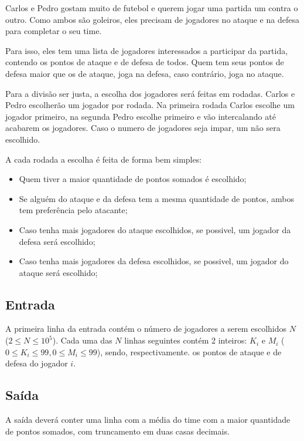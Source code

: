     Carlos e Pedro gostam muito de futebol e querem jogar uma partida um contra o outro. Como ambos são goleiros, eles precisam de jogadores no ataque e na defesa para completar o seu time.

    Para isso, eles tem uma lista de jogadores interessados a participar da partida, contendo os
pontos de ataque e de defesa de todos. Quem tem seus pontos de defesa maior que os de ataque, joga na defesa,
caso contrário, joga no ataque.

    Para a divisão ser justa, a escolha dos jogadores será feitas em rodadas. Carlos e Pedro escolherão um jogador por rodada.
Na primeira rodada Carlos escolhe um jogador primeiro, na segunda Pedro escolhe primeiro e vão intercalando até acabarem os jogadores. Caso o numero de jogadores
seja impar, um não sera escolhido.

    A cada rodada a escolha é feita de forma bem simples:
\begin{itemize}
    \item Quem tiver a maior quantidade de pontos somados é escolhido;
    \item Se alguém do ataque e da defesa tem a mesma quantidade de pontos, ambos tem preferência pelo atacante;
    \item Caso tenha mais jogadores do ataque escolhidos, se possivel, um jogador da defesa será escolhido;
    \item Caso tenha mais jogadores da defesa escolhidos, se possivel, um jogador do ataque será escolhido;
\end{itemize}

\subsection*{Entrada}

A primeira linha da entrada contém o número de jogadores a serem escolhidos $N$ ($2\leq N\leq 10^5$).
Cada uma das $N$ linhas seguintes contém 2 inteiros: $K_i$ e $M_i$ ($0\leq K_i\leq 99, 0\leq M_i\leq 99$), sendo, respectivamente. os pontos de ataque
e de defesa do jogador $i$.  

\subsection*{Saída}

A saída deverá conter uma linha com a média do time com a maior quantidade de pontos somados, com truncamento em duas casas decimais.


